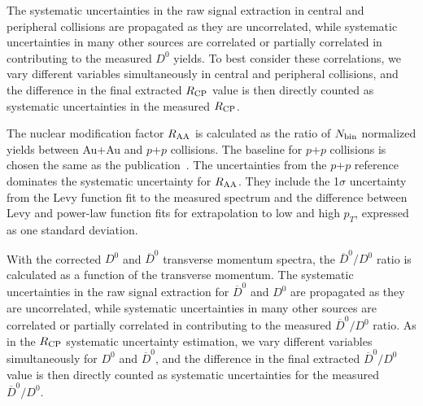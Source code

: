 \documentclass[%
 reprint,	
 amsmath,amssymb,
 aps,
 prc,
]{revtex4-1}
\begin{document}
The systematic uncertainties in the raw signal extraction in central and peripheral collisions are propagated as they are uncorrelated, while systematic uncertainties in many other sources are correlated or partially correlated in contributing to the measured $D^0$ yields. To best consider these correlations, we vary different variables simultaneously in central and peripheral collisions, and the difference in the final extracted $R_{\rm CP}$ value is then directly counted as systematic uncertainties in the measured $R_{\rm CP}$.

The nuclear modification factor $R_{\rm AA}$ is calculated as the ratio of $N_{\rm bin}$ normalized yields between Au+Au and $p$+$p$ collisions. The baseline for $p$+$p$ collisions is chosen the same as the publication~\cite{Star_D_RAA}. The uncertainties from the $p$+$p$ reference dominates the systematic uncertainty for $R_{\rm AA}$. They include the 1$\sigma$ uncertainty from the Levy function fit to the measured spectrum and the difference between Levy and power-law function fits for extrapolation to low and high $p_T$, expressed as one standard deviation.

With the corrected $D^0$ and $\overline{D}^{0}$ transverse momentum spectra, the $\overline{D}^{0}/D^0$ ratio is calculated as a function of the transverse momentum. The systematic uncertainties in the raw signal extraction for $\overline{D}^{0}$ and $D^0$ are propagated as they are uncorrelated, while systematic uncertainties in many other sources are correlated or partially correlated in contributing to the measured $\overline{D}^{0}/D^0$ ratio. As in the $R_{\rm CP}$ systematic uncertainty estimation, we vary different variables simultaneously for $D^0$ and $\overline{D}^{0}$, and the difference in the final extracted $\overline{D}^{0}/D^0$ value is then directly counted as systematic uncertainties for the measured $\overline{D}^{0}/D^0$.
\end{document}
